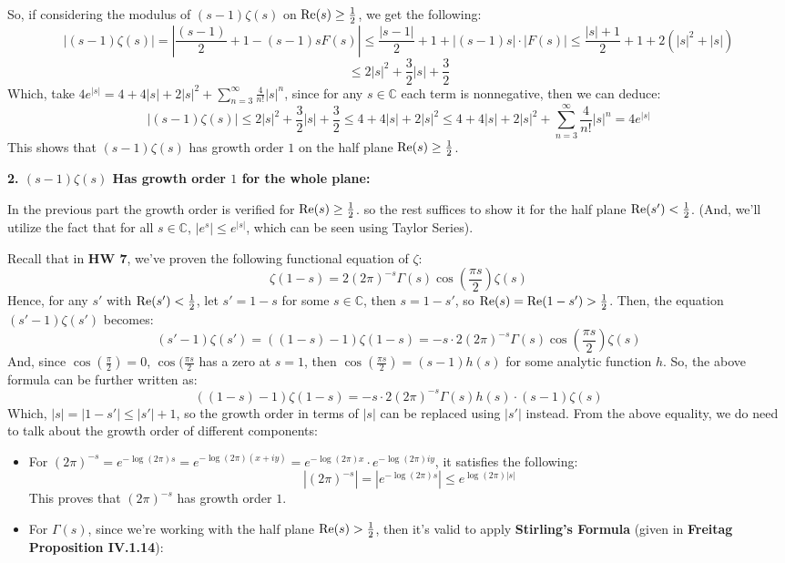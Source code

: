 \documentclass{article}
\begin{document}
\begin{itemize}
    So, if considering the modulus of $(s-1)\zeta(s)$ on $\textmd{Re}(s)\geq \frac{1}{2}$, we get the following:
    $$|(s-1)\zeta(s)| = \left|\frac{(s-1)}{2}+1-(s-1)sF(s)\right|\leq \frac{|s-1|}{2} + 1 + |(s-1)s|\cdot |F(s)| \leq \frac{|s|+1}{2} + 1 + 2(|s|^2+|s|)$$
    $$\leq 2|s|^2 + \frac{3}{2}|s|+\frac{3}{2}$$
    Which, take $4e^{|s|} = 4 + 4|s| + 2|s|^2 + \sum_{n=3}^{\infty}\frac{4}{n!}|s|^n$, since for any $s\in\mathbb{C}$ each term is nonnegative, then we can deduce:
    $$|(s-1)\zeta(s)| \leq 2|s|^2 + \frac{3}{2}|s|+\frac{3}{2} \leq 4+4|s| + 2|s|^2 \leq 4 + 4|s| + 2|s|^2 + \sum_{n=3}^{\infty}\frac{4}{n!}|s|^n = 4e^{|s|}$$
    This shows that $(s-1)\zeta(s)$ has growth order $1$ on the half plane $\textmd{Re}(s)\geq \frac{1}{2}$.

    \hfil

    \textbf{2. $(s-1)\zeta(s)$ Has growth order $1$ for the whole plane:}

    In the previous part the growth order is verified for $\textmd{Re}(s)\geq \frac{1}{2}$. so the rest suffices to show it for the half plane $\textmd{Re}(s')<\frac{1}{2}$. (And, we'll utilize the fact that for all $s\in\mathbb{C}$, $|e^s|\leq e^{|s|}$, which can be seen using Taylor Series).
    
    Recall that in \textbf{HW 7}, we've proven the following functional equation of $\zeta$:
    $$\zeta(1-s) = 2(2\pi)^{-s}\Gamma(s)\cos\left(\frac{\pi s}{2}\right)\zeta(s)$$
    Hence, for any $s'$ with $\textmd{Re}(s')<\frac{1}{2}$, let $s' = 1-s$ for some $s\in\mathbb{C}$, then $s = 1-s'$, so $\textmd{Re}(s) = \textmd{Re}(1-s') > \frac{1}{2}$. Then, the equation $(s'-1)\zeta(s')$ becomes:
    $$(s'-1)\zeta(s') = ((1-s)-1)\zeta(1-s) = -s\cdot 2(2\pi)^{-s}\Gamma(s)\cos\left(\frac{\pi s}{2}\right)\zeta(s)$$
    And, since $\cos(\frac{\pi}{2})=0$, $\cos(\frac{\pi s}{2}$ has a zero at $s=1$, then $\cos\left(\frac{\pi s}{2}\right) = (s-1)h(s)$ for some analytic function $h$. So, the above formula can be further written as:
    $$((1-s)-1)\zeta(1-s) = -s\cdot 2(2\pi)^{-s}\Gamma(s)h(s)\cdot (s-1)\zeta(s)$$
    Which, $|s| = |1-s'| \leq |s'|+1$, so the growth order in terms of $|s|$ can be replaced using $|s'|$ instead. From the above equality, we do need to talk about the growth order of different components:
    \begin{itemize}
        \item For $(2\pi)^{-s} = e^{-\log(2\pi)s} = e^{-\log(2\pi)(x+iy)} = e^{-\log(2\pi)x}\cdot e^{-\log(2\pi)iy}$, it satisfies the following: 
        $$|(2\pi)^{-s}| =  |e^{-\log(2\pi)s}| \leq e^{\log(2\pi)|s|}$$
        This proves that $(2\pi)^{-s}$ has growth order $1$.
        \item For $\Gamma(s)$, since we're working with the half plane $\textmd{Re}(s)>\frac{1}{2}$, then it's valid to apply \textbf{Stirling's Formula} (given in \textbf{Freitag Proposition IV.1.14}): 
        

\end{itemize}
\end{itemize}
\end{document}
